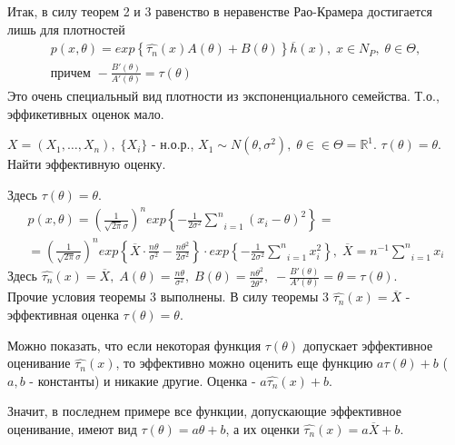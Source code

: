 Итак, в силу теорем 2 и 3 равенство в неравенстве Рао-Крамера достигается лишь для плотностей
$$\begin{gathered}
	p(x, \theta) = exp\left\{ \hat{\tau_n}(x) A(\theta) + B(\theta) \right\} \overline{h}(x), \; x \in N_P, \; \theta \in \Theta, \\
	\text{причем } -\frac{B'(\theta)}{A'(\theta)} = \tau(\theta)
\end{gathered}$$
Это очень специальный вид плотности из экспоненциального семейства. Т.о., эффикетивных оценок мало.

\begin{example}[]\label{lec:4/example:4}
	$X = (X_1, \dots, X_n), \; \{X_i\}$ - н.о.р., $X_1 \sim N(\theta, \sigma^2), \; \theta \in \in \Theta = \mathbb{R}^1$. $\tau(\theta) = \theta$. Найти эффективную оценку.
\end{example}
\begin{solution}
	Здесь $\tau(\theta) = \theta$.
	$$\begin{gathered}
		p(x, \theta) = \left(\frac{1}{\sqrt{2 \pi} \sigma}\right)^n exp\left\{ -\frac{1}{2 \sigma^2} \underset{i=1}{\overset{n}{\sum}} (x_i - \theta)^2 \right\} =\\
		= \left(\frac{1}{\sqrt{2 \pi} \sigma}\right)^n exp\left\{ \overline{X} \cdot \frac{n \theta}{\sigma^2} - \frac{n \theta^2}{2 \sigma^2} \right\} \cdot exp \left\{ -\frac{1}{2 \sigma^2} \underset{i=1}{\overset{n}{\sum}}x_i^2 \right\}, \; \overline{X} = n^{-1} \underset{i=1}{\overset{n}{\sum}}x_i 
	\end{gathered}$$
	Здесь $\hat{\tau_n}(x) = \overline{X}, \; A(\theta) = \frac{n \theta}{\sigma^2}, \; B(\theta) = \frac{n \theta^2}{2 \theta^2}, \; -\frac{B'(\theta)}{A'(\theta)} = \theta = \tau (\theta)$.\\
	Прочие условия теоремы 3 выполнены. В силу теоремы 3 $\hat{\tau_n}(x) = \overline{X}$ - эффективная оценка $\tau(\theta) = \theta$.
\end{solution}

\vspace{0.3cm}
Можно показать, что если некоторая функция $\tau(\theta)$ допускает эффективное оценивание $\hat{\tau_n}(x)$, то эффективно можно оценить еще функцию $a \tau(\theta) + b$ ($a,b$ - константы) и никакие другие. Оценка - $a \hat{\tau_n}(x) + b$.

Значит, в последнем примере все функции, допускающие эффективное оценивание, имеют вид $\tau(\theta) = a \theta + b$, а их оценки $\hat{\tau_n}(x) = a \overline{X} + b$.














